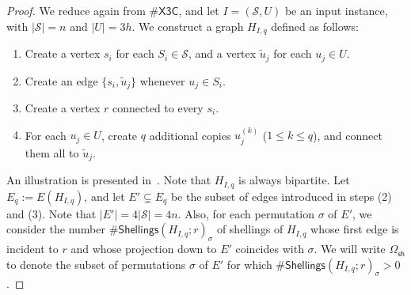\documentclass[11pt]{amsart}
\newcommand{\ns}{s}
\newcommand{\nou}{\tilde{u}}
\newcommand{\omsh}{\Omega_{\mathsf{sh}}}
\begin{document}
\begin{proof}
    
We reduce again from $\#\mathsf{X3C}$, and let $I = (\mathcal{S}, U)$ be an input instance, with $|\mathcal{S}| = n$ and $|U| = 3h$.
We construct a graph $H_{I, q}$ defined as follows:
\begin{enumerate}
    \item Create a vertex $\ns_i$ for each $S_i \in \mathcal{S}$, and a vertex $\nou_j$ for each $u_j \in U$.
    \item Create an edge $\{\ns_i, \nou_j\}$ whenever $u_j \in S_i$.
    \item Create a vertex $r$ connected to every $\ns_i$.
    \item For each $u_j \in U$, create $q$ additional copies $u_j^{(k)}$ ($1 \leq k \leq q$), and connect them all to $\nou_j$.
\end{enumerate}
An illustration is presented in~. Note that $H_{I, q}$ is always bipartite.
Let $E_q := E(H_{I, q})$,
and let $E' \subsetneq E_q$ be the subset of edges introduced in steps (2) and (3). Note that $|E'| = 4|\mathcal{S}| = 4n$.
Also, for each permutation $\sigma$ of $E'$, we consider the number $\#\mathsf{Shellings}(H_{I, q}; r)_{\sigma}$ of shellings of $H_{I, q}$ whose first edge is incident to $r$ and whose projection down to $E'$ coincides with $\sigma$. We will write $\omsh$ to denote the subset of permutations $\sigma$ of $E'$ for which $\#\mathsf{Shellings}(H_{I, q}; r)_{\sigma} > 0$.


\end{proof}
\end{document}

